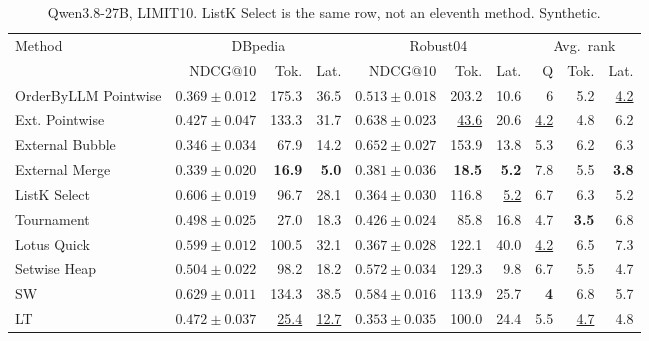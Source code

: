 \begin{table}[t]
\centering\footnotesize\setlength{\tabcolsep}{3.2pt}\renewcommand{\arraystretch}{1.12}
\caption{Qwen3.8-27B, LIMIT10. ListK Select is the same row, not an eleventh method. Synthetic.}
\begin{tabular}{@{}lrrrrrrrrr@{}}
\toprule
Method & \multicolumn{3}{c}{DBpedia} & \multicolumn{3}{c}{Robust04} & \multicolumn{3}{c}{Avg.\ rank} \\
\cmidrule(lr){2-4} \cmidrule(lr){5-7} \cmidrule(lr){8-10}
 & NDCG@10 & Tok. & Lat. & NDCG@10 & Tok. & Lat. & Q & Tok. & Lat. \\
\midrule
OrderByLLM Pointwise & $0.369\pm0.012$ & 175.3 & 36.5 & $0.513\pm0.018$ & 203.2 & 10.6 & 6 & 5.2 & \underline{4.2} \\
Ext. Pointwise & $0.427\pm0.047$ & 133.3 & 31.7 & \underline{$0.638\pm0.023$} & \underline{43.6} & 20.6 & \underline{4.2} & 4.8 & 6.2 \\
External Bubble & $0.346\pm0.034$ & 67.9 & 14.2 & \textbf{$0.652\pm0.027$} & 153.9 & 13.8 & 5.3 & 6.2 & 6.3 \\
External Merge & $0.339\pm0.020$ & \textbf{16.9} & \textbf{5.0} & $0.381\pm0.036$ & \textbf{18.5} & \textbf{5.2} & 7.8 & 5.5 & \textbf{3.8} \\
ListK Select & \underline{$0.606\pm0.019$} & 96.7 & 28.1 & $0.364\pm0.030$ & 116.8 & \underline{5.2} & 6.7 & 6.3 & 5.2 \\
Tournament & $0.498\pm0.025$ & 27.0 & 18.3 & $0.426\pm0.024$ & 85.8 & 16.8 & 4.7 & \textbf{3.5} & 6.8 \\
Lotus Quick & $0.599\pm0.012$ & 100.5 & 32.1 & $0.367\pm0.028$ & 122.1 & 40.0 & \underline{4.2} & 6.5 & 7.3 \\
Setwise Heap & $0.504\pm0.022$ & 98.2 & 18.2 & $0.572\pm0.034$ & 129.3 & 9.8 & 6.7 & 5.5 & 4.7 \\
SW & \textbf{$0.629\pm0.011$} & 134.3 & 38.5 & $0.584\pm0.016$ & 113.9 & 25.7 & \textbf{4} & 6.8 & 5.7 \\
LT & $0.472\pm0.037$ & \underline{25.4} & \underline{12.7} & $0.353\pm0.035$ & 100.0 & 24.4 & 5.5 & \underline{4.7} & 4.8 \\
\bottomrule
\end{tabular}
\end{table}

